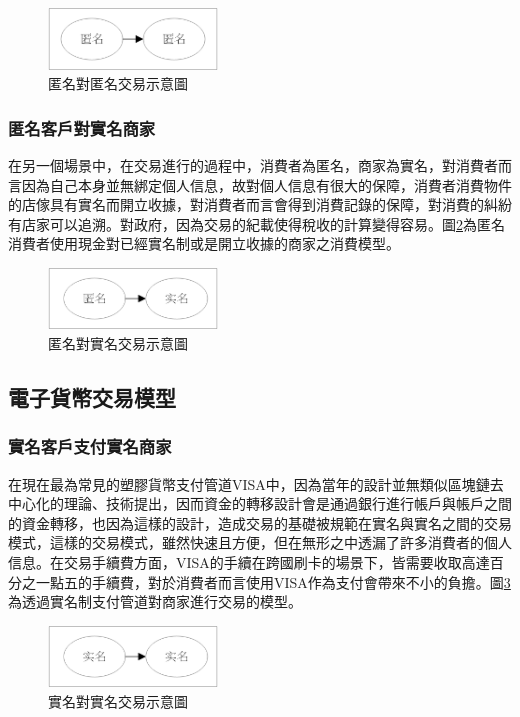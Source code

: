 		\begin{figure}[htbp]
			\centering
			\includegraphics[width = 0.4\textwidth]{modeaa.png}
			\caption{匿名對匿名交易示意圖}\label{modeaa}
		\end{figure}

		\subsubsection{匿名客戶對實名商家}
		在另一個場景中，在交易進行的過程中，消費者為匿名，商家為實名，對消費者而言因為自己本身並無綁定個人信息，故對個人信息有很大的保障，消費者消費物件的店傢具有實名而開立收據，對消費者而言會得到消費記錄的保障，對消費的糾紛有店家可以追溯。對政府，因為交易的紀載使得稅收的計算變得容易。圖\ref{modean}為匿名消費者使用現金對已經實名制或是開立收據的商家之消費模型。

		\begin{figure}[htbp]
			\centering
			\includegraphics[width = 0.4\textwidth]{modean.png}
			\caption{匿名對實名交易示意圖}\label{modean}
		\end{figure}

	\subsection{電子貨幣交易模型}

		\subsubsection{實名客戶支付實名商家}
		在現在最為常見的塑膠貨幣支付管道VISA中，因為當年的設計並無類似區塊鏈去中心化的理論、技術提出，因而資金的轉移設計會是通過銀行進行帳戶與帳戶之間的資金轉移，也因為這樣的設計，造成交易的基礎被規範在實名與實名之間的交易模式，這樣的交易模式，雖然快速且方便，但在無形之中透漏了許多消費者的個人信息。在交易手續費方面，VISA的手續在跨國刷卡的場景下，皆需要收取高達百分之一點五的手續費，對於消費者而言使用VISA作為支付會帶來不小的負擔。圖\ref{modenn}為透過實名制支付管道對商家進行交易的模型。

		\begin{figure}[htbp]
			\centering
			\includegraphics[width = 0.4\textwidth]{modenn.png}
			\caption{實名對實名交易示意圖}\label{modenn}
		\end{figure}

